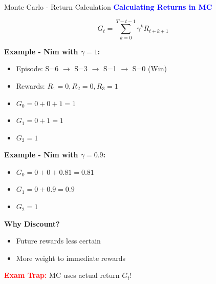 \documentclass[8pt]{beamer}
\begin{document}
	\begin{frame}{Monte Carlo - Return Calculation}
		\fontsize{6.5}{7.5}\selectfont
		\textcolor{blue}{\textbf{Calculating Returns in MC}}
		
		\[
		G_t = \sum_{k=0}^{T-t-1} \gamma^k R_{t+k+1}
		\]
		
		\textbf{Example - Nim with $\gamma = 1$:}
		\begin{itemize}
			\item Episode: S=6 $\rightarrow$ S=3 $\rightarrow$ S=1 $\rightarrow$ S=0 (Win)
			\item Rewards: $R_1=0, R_2=0, R_3=1$
			\item $G_0 = 0 + 0 + 1 = 1$
			\item $G_1 = 0 + 1 = 1$
			\item $G_2 = 1$
		\end{itemize}
		
		\textbf{Example - Nim with $\gamma = 0.9$:}
		\begin{itemize}
			\item $G_0 = 0 + 0 + 0.81 = 0.81$
			\item $G_1 = 0 + 0.9 = 0.9$
			\item $G_2 = 1$
		\end{itemize}
		
		\textbf{Why Discount?}
		\begin{itemize}
			\item Future rewards less certain
			\item More weight to immediate rewards
		\end{itemize}
		
		\textcolor{red}{\textbf{Exam Trap:}} MC uses actual return $G_t$!
	\end{frame}
	
\end{document}
